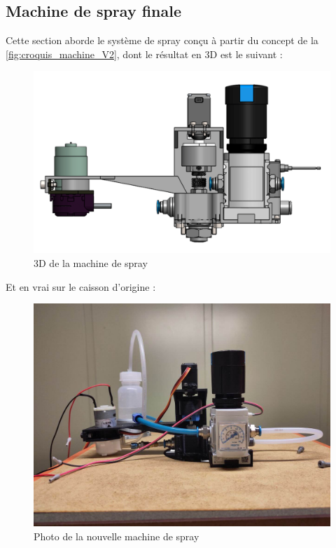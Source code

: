 \subsection{Machine de spray finale}
Cette section aborde le système de spray conçu à partir du concept de la \autoref{fig:croquis_machine_V2}, dont le résultat en 3D est le suivant :
\begin{figure}[H]
    \centering
    \includegraphics[width = \textwidth]{assets/figures/ameliorations/3D_machine_spray.png}
    \caption{3D de la machine de spray}
\end{figure}
Et en vrai sur le caisson d'origine :
\begin{figure}[H]
    \centering
    \includegraphics[width = \textwidth, trim = {0 0cm 0 4cm}, clip]{assets/figures/ameliorations/photo_machine_de_spray.jpeg}
    \caption{Photo de la nouvelle machine de spray}
\end{figure}

